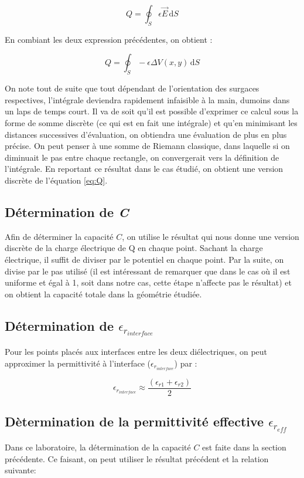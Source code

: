 \begin{equation}
	Q = \oint_S \! \epsilon \vec{E} \, \mathrm{d}S
\end{equation}

En combiant les deux expression précédentes, on obtient : 

\begin{equation}
	\label{eq:Q}
	Q = \oint_S \! -\epsilon \Delta V(x,y) \, \mathrm{d}S
\end{equation}

On note tout de suite que tout dépendant de l'orientation des surgaces respectives, l'intégrale deviendra rapidement infaisible à la main, dumoins dans un laps de temps court. Il va de soit qu'il est possible d'exprimer ce calcul sous la forme de somme discrète (ce qui est en fait une intégrale) et qu'en minimisant les distances successives d'évaluation, on obtiendra une évaluation de plus en plus précise. On peut penser à une somme de Riemann classique, dans laquelle si on diminuait le pas entre chaque rectangle, on convergerait vers la définition de l'intégrale. En reportant ce résultat dans le cas étudié, on obtient une version discrète de l'équation \ref{eq:Q}.

\subsection{Détermination de \textit{C}}
Afin de déterminer la capacité $C$, on utilise le résultat qui nous donne une version discrète de la charge électrique de Q en chaque point. Sachant la charge électrique, il suffit de diviser par le potentiel en chaque point. Par la suite, on divise par le pas utilisé (il est intéressant de remarquer que dans le cas où il est uniforme et égal à 1, soit dans notre cas, cette étape n'affecte pas le résultat) et on obtient la capacité totale dans la géométrie étudiée.

\subsection{Détermination de $\epsilon_{r_{interface}}$}
Pour les points placés aux interfaces entre les deux diélectriques, on peut approximer la permittivité à l'interface ($\epsilon_{r_{interface}}$) par : 

\begin{equation}
	\epsilon_{r_{interface}} \approx \frac{ (\epsilon_{r1}+\epsilon_{r2})}{2}
\end{equation}

\subsection{Dètermination de la permittivité effective $\epsilon_{r_{eff}}$}
Dans ce laboratoire, la détermination de la capacité $C$ est faite dans la section précédente. Ce faisant, on peut utiliser le résultat précédent et la relation suivante:

